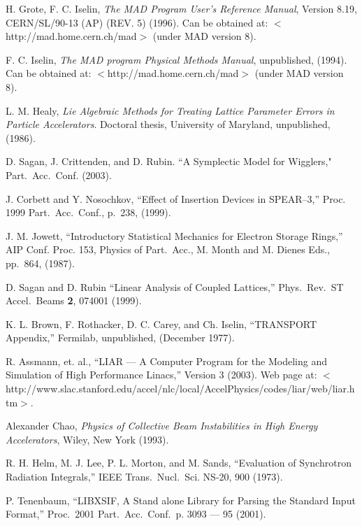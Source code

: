 \begin{thebibliography}{99}

H. Grote, F. C. Iselin, {\it The MAD Program User's Reference Manual},
Version 8.19, CERN/SL/90-13 (AP) (REV. 5) (1996). Can be obtained at:
$<$http://mad.home.cern.ch/mad$>$ (under MAD version 8).

F. C. Iselin, {\it The MAD program Physical Methods Manual}, 
unpublished, (1994).  Can be obtained at: $<$http://mad.home.cern.ch/mad$>$
(under MAD version 8).

L. M. Healy, {\it Lie Algebraic Methods for Treating Lattice Parameter
Errors in Particle Accelerators}. Doctoral thesis, University of
Maryland, unpublished, (1986).

D. Sagan, J. Crittenden, and D. Rubin.
``A Symplectic Model for Wigglers," Part.\ Acc.\ Conf. (2003).

J. Corbett and Y. Nosochkov, ``Effect of Insertion Devices in SPEAR--3,''
Proc. 1999 Part.\ Acc.\ Conf., p.~238, (1999).

J. M. Jowett, ``Introductory Statistical Mechanics
for Electron Storage Rings,'' AIP Conf. Proc. 153, Physics of Part.\ Acc.,
M. Month and M. Dienes Eds., pp.~864, (1987).

D. Sagan and D. Rubin ``Linear Analysis of Coupled Lattices,''
Phys.\ Rev.\ ST Accel.\ Beams {\bf 2}, 074001 (1999).

K. L. Brown, F. Rothacker, D. C. Carey, and Ch. Iselin, ``TRANSPORT
Appendix,'' Fermilab, unpublished, (December 1977).

R. Assmann, et. al., ``LIAR --- A Computer Program for the Modeling
and Simulation of High Performance Linacs,'' Version 3 (2003). Web page
at: \hfill\break\hspace*{0.2in}
$<$http://www.slac.stanford.edu/accel/nlc/local/AccelPhysics/codes/liar/web/liar.htm$>$.

 Alexander Chao, {\em Physics of Collective Beam
Instabilities in High Energy Accelerators}, Wiley, New York (1993). 

R. H. Helm, M. J. Lee, P. L. Morton, and M. Sands, ``Evaluation of Synchrotron
Radiation Integrals,'' IEEE Trans.~Nucl.~Sci. NS-20, 900 (1973).

P. Tenenbaum, ``LIBXSIF, A Stand alone Library for Parsing the Standard 
Input Format,'' Proc.\ 2001 Part.\ Acc.\ Conf.\ p. 3093 --- 95 (2001).


\end{thebibliography}
